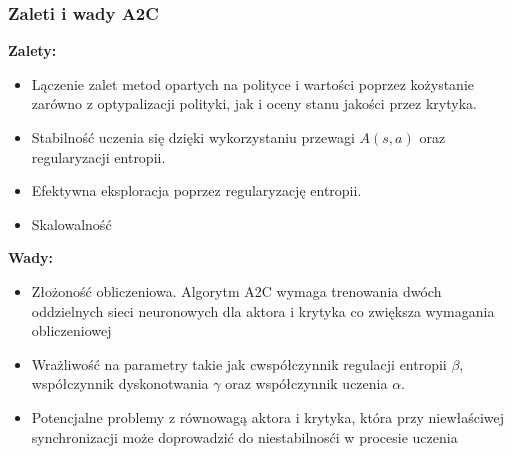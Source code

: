 \documentclass[a4paper, 10pt]{article}
\begin{document}
    \subsubsection{Zaleti i wady A2C}
    \noindent \textbf{Zalety:}
    \begin{itemize}
        \item Lączenie zalet metod opartych na polityce i wartości poprzez kożystanie zarówno z optypalizacji polityki, jak i oceny stanu jakości przez krytyka.
        \item Stabilność uczenia się dzięki wykorzystaniu przewagi \( A(s,a) \) oraz regularyzacji entropii.
        \item Efektywna eksploracja poprzez regularyzację entropii.
        \item Skalowalność
    \end{itemize}
    \textbf{Wady:}
    \begin{itemize}
        \item Złożoność obliczeniowa. Algorytm A2C wymaga trenowania dwóch oddzielnych sieci neuronowych dla aktora i krytyka co zwiększa
        wymagania obliczeniowej
        \item Wrażliwość na parametry takie jak cwspółczynnik regulacji entropii \( \beta \), współczynnik dyskonotwania \( \gamma \) 
        oraz współczynnik uczenia \( \alpha \).
        \item Potencjalne problemy z równowagą aktora i krytyka, która przy niewłaściwej synchronizacji może doprowadzić do niestabilnosći w procesie uczenia
    \end{itemize}
\end{document}
